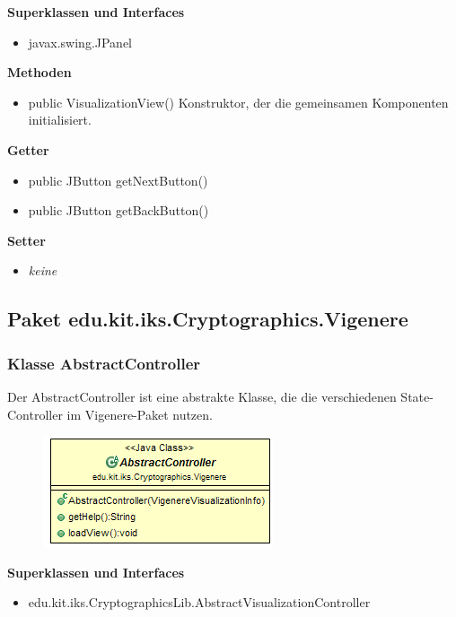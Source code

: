 \documentclass{article}
\begin{document}
      \textbf{Superklassen und Interfaces}
      \begin{itemize}
        \item javax.swing.JPanel
      \end{itemize}
	
      \textbf{Methoden}
      \begin{itemize}
        \item public VisualizationView() \newline
          Konstruktor, der die gemeinsamen Komponenten initialisiert.
      \end{itemize}
      
      \textbf{Getter}
      \begin{itemize}
		\item public JButton getNextButton()
		\item public JButton getBackButton()
      \end{itemize}
      
      \textbf{Setter}
      \begin{itemize}
        \item \textit{keine}
      \end{itemize}
	
  \subsection{Paket edu.kit.iks.Cryptographics.Vigenere}
    \subsubsection{Klasse AbstractController}
      Der AbstractController ist eine abstrakte Klasse, die die verschiedenen State-Controller im Vigenere-Paket nutzen.
      \begin{figure}[H]
        \centering
        \includegraphics{resources/edu-kit-iks-Cryptographics-Vigenere-AbstractController}
      \end{figure}

      \textbf{Superklassen und Interfaces}
      \begin{itemize}
        \item edu.kit.iks.CryptographicsLib.AbstractVisualizationController
      \end{itemize}
      
\end{document}
